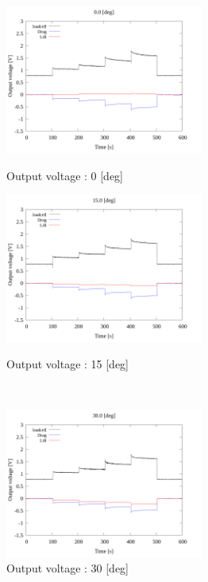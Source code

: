 \begin{figure}[htbp]
    \begin{minipage}[b]{0.45\linewidth}
      \centering
      \includegraphics[width=65mm]{../../02_workspace/result/2-1/plot/01-3_allsensors/01_allsensors_0.png}
      \caption{Output voltage : 0 [deg]}
    \end{minipage}
    \begin{minipage}[b]{0.45\linewidth}
      \centering
      \includegraphics[width=65mm]{../../02_workspace/result/2-1/plot/01-3_allsensors/01_allsensors_150.png}
      \caption{Output voltage : 15 [deg]}
    \end{minipage} \\
    \begin{minipage}[b]{0.45\linewidth}
        \centering
        \includegraphics[width=65mm]{../../02_workspace/result/2-1/plot/01-3_allsensors/01_allsensors_300.png}
        \caption{Output voltage : 30 [deg]}
      \end{minipage}
      \begin{minipage}[b]{0.45\linewidth}

\end{minipage}
\end{figure}
